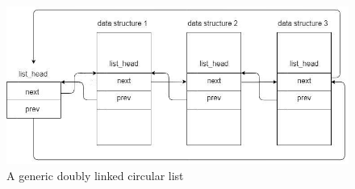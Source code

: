 \begin{figure}[ht]
\includegraphics[width=\textwidth]{images/list.png}
\caption{A generic doubly linked circular list}
\label{img:list}
\end{figure}

